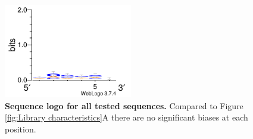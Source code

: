 \documentclass{scrartcl}[2013/05/29]%
\begin{document}
\begin{figure}[!ht]
   \centering
   \includegraphics[width=0.5\textwidth]{plots/Supplementary/All_logo.pdf}
   \caption{\textbf{Sequence logo for all tested sequences.} Compared to Figure \ref{fig:Library characteristics}A there are no significant biases at each position.}
   \label{fig: All_logo}
\end{figure}
\end{document}
